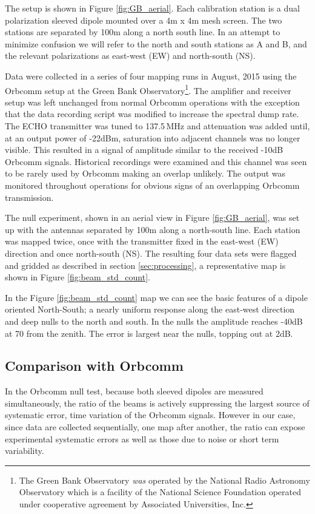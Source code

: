 \documentclass[preprint2,numberedappendix,tighten,twocolappendix]{aastex6}
\begin{document}
The setup is shown in Figure \ref{fig:GB_aerial}.  Each calibration station is a dual polarization sleeved dipole mounted over a 4m x 4m mesh screen.  The two stations are separated by 100m along a north south line. In an attempt to minimize confusion we will refer to the north and south stations as A and B, and the relevant polarizations as east-west (EW) and north-south (NS).


Data were collected in a series of four mapping runs in August, 2015 using the Orbcomm setup at the Green Bank Observatory\footnote{The Green Bank Observatory \emph{was} operated by the National Radio Astronomy Observatory which is a facility of the National Science Foundation operated under cooperative agreement by Associated Universities, Inc.}.  The amplifier and receiver setup was left unchanged from normal Orbcomm operations with the exception that the data recording script was modified to increase the spectral dump rate. The ECHO transmitter was tuned to 137.5\,MHz and attenuation was added until, at an output power of -22dBm, saturation into adjacent channels was no longer visible.  This resulted in a signal of amplitude similar to the received -10dB Orbcomm signals. Historical recordings were examined and this channel was seen to be rarely used by Orbcomm making an overlap unlikely.  The output was monitored throughout operations for obvious signs of an overlapping Orbcomm transmission.

The null experiment, shown in an aerial view in Figure \ref{fig:GB_aerial}, was set up with the antennas separated by 100m along a north-south line.  Each station was mapped twice, once with the transmitter fixed in the east-west (EW) direction and once north-south (NS).  The resulting four data sets were flagged and gridded as described in section \ref{sec:processing}, a representative map is shown in Figure \ref{fig:beam_std_count}. 

In the Figure \ref{fig:beam_std_count} map we can see the basic features of a dipole oriented North-South; a nearly uniform response along the east-west direction and deep nulls to the north and south.  In the nulls the amplitude reaches -40dB at 70\arcdeg{} from the zenith.  The error is largest near the nulls, topping out at 2dB.


\subsection{Comparison with Orbcomm}
\label{sec:orbcomm}
In the Orbcomm null test, because both sleeved dipoles are measured simultaneously,  the ratio of the beams is actively suppressing the largest source of systematic error, time variation of the Orbcomm signals. However in our case, since data are collected sequentially, one map after another, the ratio can expose experimental systematic errors as well as those due to noise or short term variability.
\end{document}
